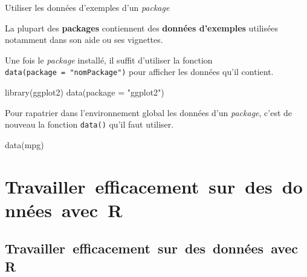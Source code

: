 \documentclass[12pt,handout,ignorenonframetext,]{beamer}
\newenvironment{Shaded}{}{}
\newcommand{\KeywordTok}[1]{\textcolor[rgb]{0.00,0.00,1.00}{#1}}
\newcommand{\DataTypeTok}[1]{#1}
\newcommand{\StringTok}[1]{\textcolor[rgb]{0.00,0.50,0.50}{#1}}
\newcommand{\NormalTok}[1]{#1}
\renewenvironment{Shaded}{\begin{snugshade}}{\end{snugshade}}
\begin{document}
\begin{frame}[fragile]{Utiliser les données d'exemples d'un
\emph{package}}

La plupart des \textbf{packages} contiennent des \textbf{données
d'exemples} utilisées notamment dans son aide ou ses vignettes.

Une fois le \emph{package} installé, il suffit d'utiliser la fonction
\texttt{data(package\ =\ "nomPackage")} pour afficher les données qu'il
contient.

\begin{Shaded}
\begin{Highlighting}[]
\KeywordTok{library}\NormalTok{(ggplot2)}
\KeywordTok{data}\NormalTok{(}\DataTypeTok{package =} \StringTok{"ggplot2"}\NormalTok{)}
\end{Highlighting}
\end{Shaded}

\pause Pour \og rapatrier \fg{} dans l'environnement global les données
d'un \emph{package}, c'est de nouveau la fonction \texttt{data()} qu'il
faut utiliser.

\begin{Shaded}
\begin{Highlighting}[]
\KeywordTok{data}\NormalTok{(mpg)}
\end{Highlighting}
\end{Shaded}

\end{frame}

\section{Travailler~efficacement~sur~des~données~avec~R}\label{travaillerefficacementsurdesdonneesavecr}

\subsection*{Travailler~efficacement~sur~des~données~avec~R}\label{travaillerefficacementsurdesdonneesavecr-1}
\end{document}
